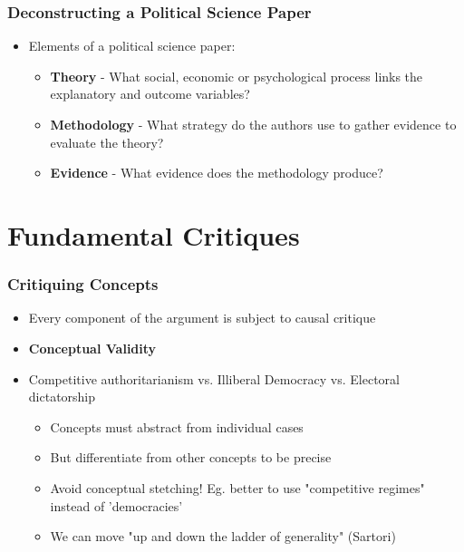 \documentclass[xcolor=x11names,compress]{beamer}\usepackage[]{graphicx}\usepackage[]{color}
\renewcommand{\(}{\begin{columns}}
\renewcommand{\)}{\end{columns}}
\newcommand{\<}[1]{\begin{column}{#1}}
\renewcommand{\>}{\end{column}}
\begin{document}
\begin{frame}
\frametitle{Deconstructing a Political Science Paper}
\begin{itemize}
\item Elements of a political science paper:
\pause
\begin{itemize}
\item \textbf{Theory} - What social, economic or psychological process links the explanatory and outcome variables? 
\pause
\item \textbf{Methodology} - What strategy do the authors use to gather evidence to evaluate the theory?
\pause
\item \textbf{Evidence} - What evidence does the methodology produce?
\end{itemize}
\end{itemize}
\end{frame}



\section{Fundamental Critiques}

\begin{frame}
\frametitle{Critiquing Concepts}
\begin{itemize}
\item Every component of the argument is subject to causal critique
\pause
\item \textbf{Conceptual Validity}
\pause
\item Competitive authoritarianism vs. Illiberal Democracy vs. Electoral dictatorship
\pause
\begin{itemize}
\item Concepts must abstract from individual cases
\pause
\item But differentiate from other concepts to be precise
\pause
\item Avoid conceptual stetching! Eg. better to use "competitive regimes" instead of 'democracies'
\pause
\item We can move "up and down the ladder of generality" (Sartori)
\pause
\end{itemize}
\end{itemize}
\end{frame}
\end{document}
